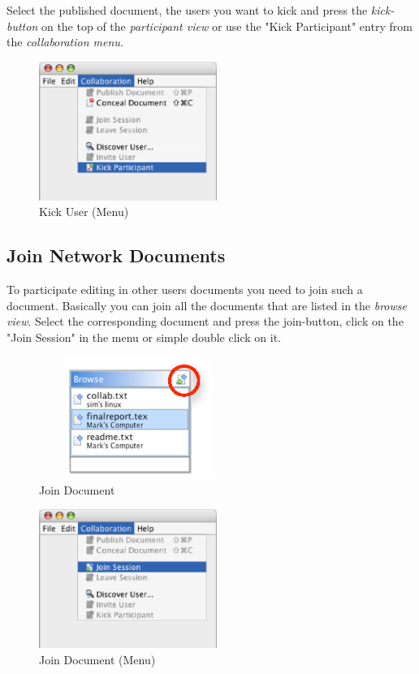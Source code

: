 \documentclass[11pt,a4paper]{article}
\begin{document}
Select the published document, the users you want to kick and press the \textit{kick-button} on the top of the \textit{participant view} or use the "Kick Participant" entry from the \textit{collaboration menu}.

\begin{figure}[H]
\begin{center}
  \includegraphics[height=1.78in, width=2.28in]{../images/usermanual/menu_collab_kick.eps}
\caption{Kick User (Menu)}
\label{default}
\end{center}
\end{figure}

\subsection{Join Network Documents}
\label{join_leave_documents}
To participate editing in other users documents you need to join such a document. Basically you can join all the documents that are listed in the \textit{browse view}. Select the corresponding document and press the join-button, click on the "Join Session" in the menu or simple double click on it.

\begin{figure}[H]
\begin{center}
  \includegraphics[height=1.56in, width=2.56in]{../images/usermanual/g_bview_join.eps}
\caption{Join Document}
\label{default}
\end{center}
\end{figure}

\begin{figure}[H]
\begin{center}
  \includegraphics[height=1.78in, width=2.28in]{../images/usermanual/menu_collab_join.eps}
\caption{Join Document (Menu)}
\label{default}
\end{center}
\end{figure}
\end{document}
